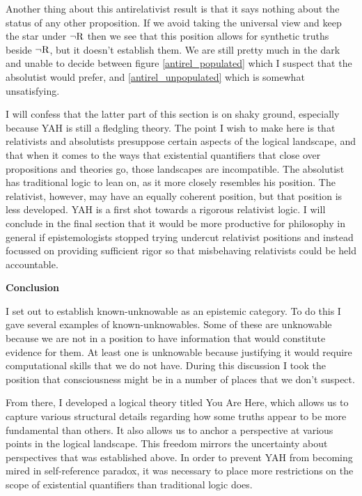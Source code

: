 \documentclass[12pt]{article}
\begin{document}
\begin{flushleft}
Another thing about this antirelativist result is that it says nothing about the status of any other proposition.
If we avoid taking the universal view and keep the star under $\neg \textnormal{R}$ then we see that this position allows for synthetic truths beside $\neg \textnormal{R}$, but it doesn't establish them.
We are still pretty much in the dark and unable to decide between figure \ref{antirel_populated} which I suspect that the absolutist would prefer, and \ref{antirel_unpopulated} which is somewhat unsatisfying.

I will confess that the latter part of this section is on shaky ground, especially because YAH is still a fledgling theory.
The point I wish to make here is that relativists and absolutists presuppose certain aspects of the logical landscape, and that when it comes to the ways that existential quantifiers that close over propositions and theories go, those landscapes are incompatible.
The absolutist has traditional logic to lean on, as it more closely resembles his position.
The relativist, however, may have an equally coherent position, but that position is less developed.
YAH is a first shot towards a rigorous relativist logic.
I will conclude in the final section that it would be more productive for philosophy in general if epistemologists stopped trying undercut relativist positions and instead focussed on providing sufficient rigor so that misbehaving relativists could be held accountable.

\setlength{\parindent}{0in}
\par\bigskip
\textbf{Conclusion}
\setlength{\parindent}{0.5in}

I set out to establish known-unknowable as an epistemic category.
To do this I gave several examples of known-unknowables.
Some of these are unknowable because we are not in a position to have information that would constitute evidence for them.
At least one is unknowable because justifying it would require computational skills that we do not have.
During this discussion I took the position that consciousness might be in a number of places that we don't suspect.

From there, I developed a logical theory titled You Are Here, which allows us to capture various structural details regarding how some truths appear to be more fundamental than others.
It also allows us to anchor a perspective at various points in the logical landscape.
This freedom mirrors the uncertainty about perspectives that was established above.
In order to prevent YAH from becoming mired in self-reference paradox, it was necessary to place more restrictions on the scope of existential quantifiers than traditional logic does.


\end{flushleft}
\end{document}
